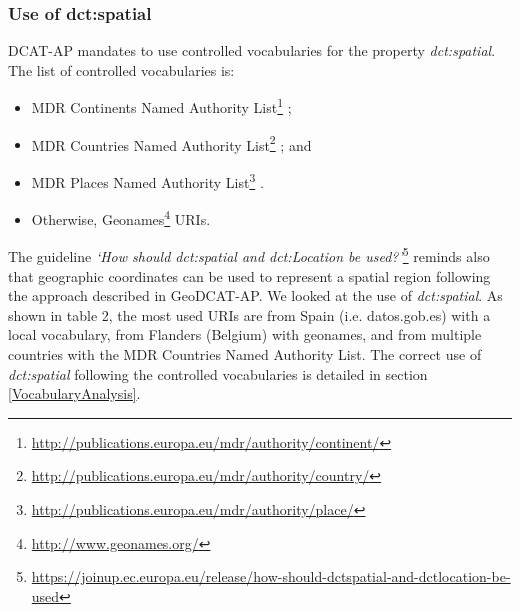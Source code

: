 \documentclass[<options>]{elsarticle}
\begin{document}
\subsubsection*{Use of dct:spatial}
DCAT-AP mandates to use controlled vocabularies for the property \textit{dct:spatial}. The list of controlled vocabularies is:

\begin{itemize}
\item MDR Continents Named Authority List\footnote{\href{  http://publications.europa.eu/mdr/authority/continent/}{  http://publications.europa.eu/mdr/authority/continent/}} ;
\item MDR Countries Named Authority List\footnote{\href{  http://publications.europa.eu/mdr/authority/country/}{  http://publications.europa.eu/mdr/authority/country/}} ; and
\item MDR Places Named Authority List\footnote{\href{  http://publications.europa.eu/mdr/authority/place/}{  http://publications.europa.eu/mdr/authority/place/}} .
\item Otherwise, Geonames\footnote{\href{  http://www.geonames.org/}{  http://www.geonames.org/}} URIs.
\end{itemize}

The guideline \textit{‘How should dct:spatial and dct:Location be used?’}\footnote{\href{  https://joinup.ec.europa.eu/release/how-should-dctspatial-and-dctlocation-be-used}{  https://joinup.ec.europa.eu/release/how-should-dctspatial-and-dctlocation-be-used}} reminds also that geographic coordinates can be used to represent a spatial region following the approach described in GeoDCAT-AP. We looked at the use of \textit{dct:spatial}. As shown in table 2, the most used URIs are from Spain (i.e. datos.gob.es) with a local vocabulary, from Flanders (Belgium) with geonames, and from multiple countries with the MDR Countries Named Authority List. The correct use of \textit{dct:spatial} following the controlled vocabularies is detailed in section \ref{VocabularyAnalysis}. 
\end{document}
